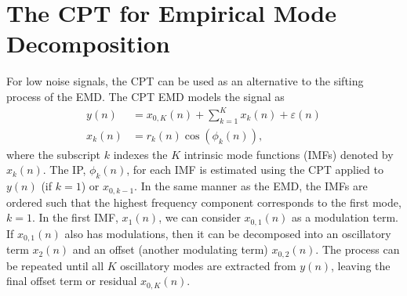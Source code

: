 \documentclass[a4paper]{IEEEtran}
\newcommand{\todo}[1]{\textsf{\emph{\textbf{\textcolor{blue}{#1}}}}}
\begin{document}
\section{The CPT for Empirical Mode Decomposition}\label{sect:CPTEMDSection}
For low noise signals, the CPT can be used as an alternative to the sifting process of the EMD. The CPT EMD models the signal as
\begin{align}
    y(n) &= x_{0,K}(n) + \sum_{k=1}^{K}x_k(n) + \varepsilon(n) \\
    x_k\left(n\right) &= r_k\left(n\right)\cos\left(\phi_k\left(n\right)\right),
\end{align}
where the subscript $k$ indexes the $K$ intrinsic mode functions (IMFs) denoted by $x_k(n)$. The IP, $\phi_k(n)$, for each IMF is estimated using the CPT applied to $y(n)$ (if $k=1$) or $x_{0,k-1}$. In the same manner as the EMD, the IMFs are ordered such that the highest frequency component corresponds to the first mode, $k=1$. In the first IMF, $x_1(n)$, we can consider $x_{0,1}(n)$ as a modulation term. If $x_{0,1}(n)$ also has modulations, then it can be decomposed into an oscillatory term $x_2(n)$ and an offset (another modulating term) $x_{0,2}(n)$. The process can be repeated until all $K$ oscillatory modes are extracted from $y(n)$, leaving the final offset term or residual $x_{0,K}(n)$.
\end{document}
